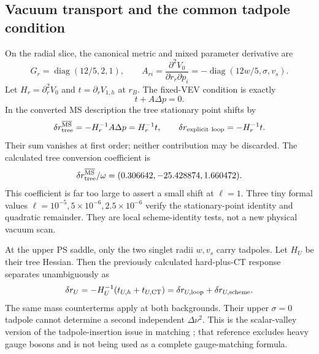 \documentclass[11pt]{article}
\newcommand{\diag}{\operatorname{diag}}
\newcommand{\MS}{\overline{\mathrm{MS}}}
\begin{document}
\subsection{Vacuum transport and the common tadpole condition}
On the radial slice, the canonical metric and mixed parameter derivative
are
\begin{equation}
 G_r=\diag(12/5,2,1),\qquad
 A_{ri}=\frac{\partial^2V_0}{\partial r_r\partial p_i}
 =-\diag(12w/5,\sigma,v_s).
\end{equation}
Let $H_r=\partial_r^2V_0$ and $t=\partial_rV_{1,h}$ at $r_B$.
The fixed-VEV condition is exactly
\begin{equation}
 t+A\Delta p=0.
 \label{eq:tad}
\end{equation}
In the converted MS description the tree stationary point shifts by
\begin{equation}
 \delta r_{\rm tree}^{\MS}=-H_r^{-1}A\Delta p=H_r^{-1}t,
 \qquad \delta r_{\rm explicit\ loop}=-H_r^{-1}t.
 \label{eq:vevshift}
\end{equation}
Their sum vanishes at first order; neither contribution may be discarded.
The calculated tree conversion coefficient is
\begin{equation}
 \delta r_{\rm tree}^{\MS}/\omega
 =(0.306642,-25.428874,1.660472).
\end{equation}
This coefficient is far too large to assert a small shift at $\ell=1$.
Three tiny formal values $\ell=10^{-5},5\times10^{-6},2.5\times10^{-6}$
verify the stationary-point identity and quadratic remainder. They are
local scheme-identity tests, not a new physical vacuum scan.

At the upper PS saddle, only the two singlet radii $w,v_s$ carry tadpoles.
Let $H_U$ be their tree Hessian. Then the previously calculated hard-plus-CT
response separates unambiguously as
\begin{equation}
 \delta r_U=-H_U^{-1}(t_{U,h}+t_{U,\rm CT})
 =\delta r_{U,\rm loop}+\delta r_{U,\rm scheme}.
\end{equation}
The same mass counterterms apply at both backgrounds. Their upper
$\sigma=0$ tadpole cannot determine a second independent $\Delta\nu^2$.
This is the scalar-valley version of the tadpole-insertion issue in
matching \cite{matching}; that reference excludes heavy gauge bosons and
is not being used as a complete gauge-matching formula.
\end{document}
